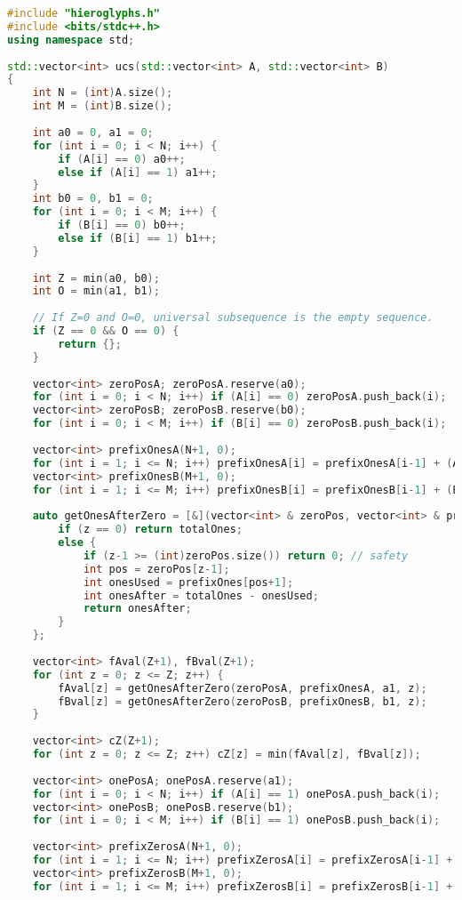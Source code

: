 \begin{lstlisting}[language=C++]
#include "hieroglyphs.h"
#include <bits/stdc++.h>
using namespace std;
 
std::vector<int> ucs(std::vector<int> A, std::vector<int> B)
{
    int N = (int)A.size();
    int M = (int)B.size();
 
    int a0 = 0, a1 = 0;
    for (int i = 0; i < N; i++) {
        if (A[i] == 0) a0++;
        else if (A[i] == 1) a1++;
    }
    int b0 = 0, b1 = 0;
    for (int i = 0; i < M; i++) {
        if (B[i] == 0) b0++;
        else if (B[i] == 1) b1++;
    }
 
    int Z = min(a0, b0);
    int O = min(a1, b1);
 
    // If Z=0 and O=0, universal subsequence is the empty sequence.
    if (Z == 0 && O == 0) {
        return {};
    }
 
    vector<int> zeroPosA; zeroPosA.reserve(a0);
    for (int i = 0; i < N; i++) if (A[i] == 0) zeroPosA.push_back(i);
    vector<int> zeroPosB; zeroPosB.reserve(b0);
    for (int i = 0; i < M; i++) if (B[i] == 0) zeroPosB.push_back(i);
 
    vector<int> prefixOnesA(N+1, 0);
    for (int i = 1; i <= N; i++) prefixOnesA[i] = prefixOnesA[i-1] + (A[i-1] == 1);
    vector<int> prefixOnesB(M+1, 0);
    for (int i = 1; i <= M; i++) prefixOnesB[i] = prefixOnesB[i-1] + (B[i-1] == 1);
 
    auto getOnesAfterZero = [&](vector<int> & zeroPos, vector<int> & prefixOnes, int totalOnes, int z) {
        if (z == 0) return totalOnes;
        else {
            if (z-1 >= (int)zeroPos.size()) return 0; // safety
            int pos = zeroPos[z-1];
            int onesUsed = prefixOnes[pos+1];
            int onesAfter = totalOnes - onesUsed;
            return onesAfter;
        }
    };
 
    vector<int> fAval(Z+1), fBval(Z+1);
    for (int z = 0; z <= Z; z++) {
        fAval[z] = getOnesAfterZero(zeroPosA, prefixOnesA, a1, z);
        fBval[z] = getOnesAfterZero(zeroPosB, prefixOnesB, b1, z);
    }
 
    vector<int> cZ(Z+1);
    for (int z = 0; z <= Z; z++) cZ[z] = min(fAval[z], fBval[z]);
 
    vector<int> onePosA; onePosA.reserve(a1);
    for (int i = 0; i < N; i++) if (A[i] == 1) onePosA.push_back(i);
    vector<int> onePosB; onePosB.reserve(b1);
    for (int i = 0; i < M; i++) if (B[i] == 1) onePosB.push_back(i);
 
    vector<int> prefixZerosA(N+1, 0);
    for (int i = 1; i <= N; i++) prefixZerosA[i] = prefixZerosA[i-1] + (A[i-1] == 0);
    vector<int> prefixZerosB(M+1, 0);
    for (int i = 1; i <= M; i++) prefixZerosB[i] = prefixZerosB[i-1] + (B[i-1] == 0);
 

\end{lstlisting}

